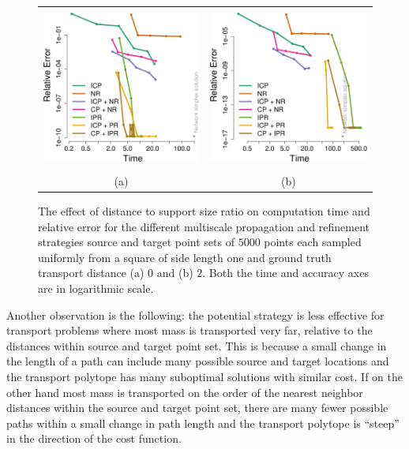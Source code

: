 \documentclass[twoside,11pt]{article}
\begin{document}
\begin{figure}[htb]
\centering
\begin{tabular}{cc}
                       \vspace{-0.3in} \\
\includegraphics[width=0.47\linewidth]{uniform-d0-performance-strategies} &
\includegraphics[width=0.47\linewidth]{uniform-d2-performance-strategies} \\
                       \vspace{-0.2in} \\
                       (a) & (b)  
\end{tabular}
  \vspace{-0.15in}
\caption{
\label{fig:distance-strategies}
The effect of distance to support size ratio on computation time and relative
error for the different multiscale propagation and refinement strategies source
and target point sets of $5000$ points each sampled uniformly from a square of
side length one and ground truth transport distance (a) $0$ and (b) $2$.  Both
the time and accuracy axes are in logarithmic scale.  } 
\end{figure}
Another observation is the following: the potential strategy is less effective
for transport problems where most mass is transported very far, relative to the
distances within source and target point set. This is because a small change in
the length of a path can include many possible source and target locations and
the transport polytope has many suboptimal solutions with similar cost. If on
the other hand most mass is transported on the order of the nearest neighbor
distances within the source and target point set, there are many fewer possible
paths within a small change in path length and the transport polytope is
``steep'' in the direction of the cost function. 
\end{document}
